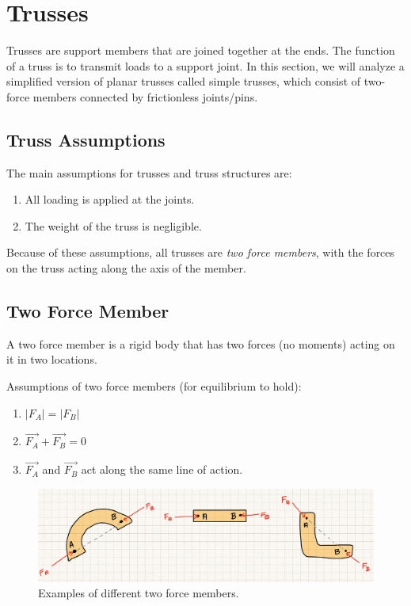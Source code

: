 \section{Trusses}

Trusses are support members that are joined together at the ends. The function of a truss is to transmit loads to a support joint. In this section, we will analyze a simplified version of planar trusses called simple trusses, which consist of two-force members connected by frictionless joints/pins.



\subsection{Truss Assumptions}

The main assumptions for trusses and truss structures are:

\begin{enumerate}
    \item {All loading is applied at the joints.}
    \item{The weight of the truss is negligible.}
\end{enumerate}

Because of these assumptions, all trusses are \textit{two force members}, with the forces on the truss acting along the axis of the member. 

\subsection{Two Force Member}

A two force member is a rigid body that has two forces (no moments) acting on it in two locations. 

Assumptions of two force members (for equilibrium to hold): 
\begin{enumerate}
\item{$|F_A| = |F_B|$}
\item{$\vec{F_A} + \vec{F_B} = 0$}
\item{$\vec{F_A}$ and $\vec{F_B}$ act along the same line of action.}
\end{enumerate}

\begin{figure}[!h]
\centering
\includegraphics[angle=0, width=5in]{TrussFigures/2ForceMembers.jpg}
\vspace{-2mm}
\caption{\small Examples of different two force members.}
\vspace{-3mm}
\label{Fig:2ForceMembers}
\end{figure}

